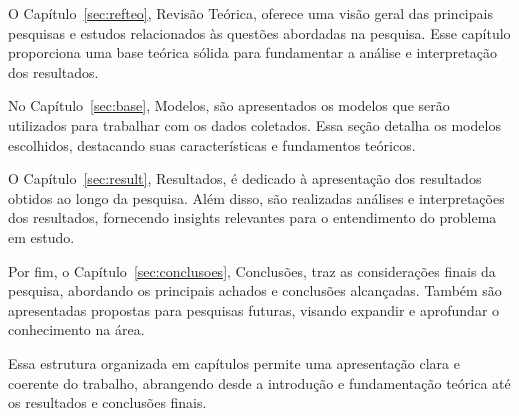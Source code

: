 O Capítulo~\ref{sec:refteo}, Revisão Teórica, oferece uma visão geral das principais pesquisas e estudos relacionados às questões abordadas na pesquisa. Esse capítulo proporciona uma base teórica sólida para fundamentar a análise e interpretação dos resultados.

No Capítulo~\ref{sec:base}, Modelos, são apresentados os modelos que serão utilizados para trabalhar com os dados coletados. Essa seção detalha os modelos escolhidos, destacando suas características e fundamentos teóricos.

O Capítulo~\ref{sec:result}, Resultados, é dedicado à apresentação dos resultados obtidos ao longo da pesquisa. Além disso, são realizadas análises e interpretações dos resultados, fornecendo insights relevantes para o entendimento do problema em estudo.

Por fim, o Capítulo~\ref{sec:conclusoes}, Conclusões, traz as considerações finais da pesquisa, abordando os principais achados e conclusões alcançadas. Também são apresentadas propostas para pesquisas futuras, visando expandir e aprofundar o conhecimento na área.

Essa estrutura organizada em capítulos permite uma apresentação clara e coerente do trabalho, abrangendo desde a introdução e fundamentação teórica até os resultados e conclusões finais.


